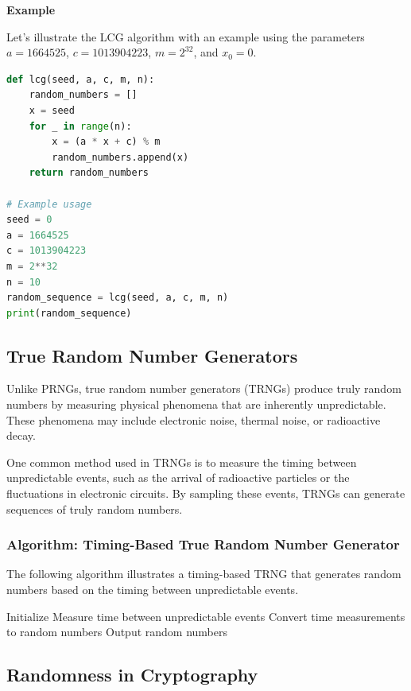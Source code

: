 \documentclass[12pt]{book} %
\begin{document}
\textbf{Example}

Let's illustrate the LCG algorithm with an example using the parameters \(a = 1664525\), \(c = 1013904223\), \(m = 2^{32}\), and \(x_0 = 0\).

\FloatBarrier
\begin{lstlisting}[language=Python]
def lcg(seed, a, c, m, n):
    random_numbers = []
    x = seed
    for _ in range(n):
        x = (a * x + c) % m
        random_numbers.append(x)
    return random_numbers

# Example usage
seed = 0
a = 1664525
c = 1013904223
m = 2**32
n = 10
random_sequence = lcg(seed, a, c, m, n)
print(random_sequence)
\end{lstlisting}
\FloatBarrier

\subsection{True Random Number Generators}

Unlike PRNGs, true random number generators (TRNGs) produce truly random numbers by measuring physical phenomena that are inherently unpredictable. These phenomena may include electronic noise, thermal noise, or radioactive decay.

One common method used in TRNGs is to measure the timing between unpredictable events, such as the arrival of radioactive particles or the fluctuations in electronic circuits. By sampling these events, TRNGs can generate sequences of truly random numbers.

\subsubsection{Algorithm: Timing-Based True Random Number Generator}

The following algorithm illustrates a timing-based TRNG that generates random numbers based on the timing between unpredictable events.
\FloatBarrier
\begin{algorithm}
\caption{Timing-Based True Random Number Generator}
\begin{algorithmic}
\State Initialize
    \State Measure time between unpredictable events
    \State Convert time measurements to random numbers
    \State Output random numbers
\EndWhile
\end{algorithmic}
\end{algorithm}
\FloatBarrier

\subsection{Randomness in Cryptography}
\end{document}
